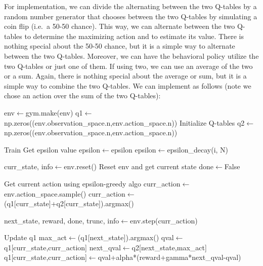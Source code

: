 For implementation, we can divide the alternating between the two Q-tables by a random number generator that chooses between the two Q-tables by simulating a coin flip (i.e.\ a 50-50 chance).
This way, we can alternate between the two Q-tables to determine the maximizing action and to estimate its value.
There is nothing special about the 50-50 chance, but it is a simple way to alternate between the two Q-tables.
Moreover, we can have the behavioral policy utilize the two Q-tables or just one of them.
If using two, we can use an average of the two or a sum.
Again, there is nothing special about the average or sum, but it is a simple way to combine the two Q-tables.
We can implement as follows (note we chose an action over the sum of the two Q-tables):
\begin{algorithm}[H]
\begin{algorithmic}[1]
        \State env$\gets$gym.make(env)
        \State q1$\gets$ np.zeros((env.observation\_space.n,env.action\_space.n))  \Comment Initialize Q-tables
        \State q2$\gets$ np.zeros((env.observation\_space.n,env.action\_space.n))

         \Comment Train
              \Comment Get epsilon value
                \State epsilon$\gets$epsilon
            \Else
                \State epsilon$\gets$epsilon\_decay(i, N)
            \EndIf

            \State curr\_state, info$\gets$env.reset()  \Comment Reset env and get current state
            \State done$\gets$False
        
                 \Comment Get current action using epsilon-greedy algo
                    \State curr\_action$\gets$env.action\_space.sample()
                \Else
                    \State curr\_action$\gets$(q1[curr\_state]+q2[curr\_state]).argmax()
                \EndIf

                \State next\_state, reward, done, trunc, info$\gets$env.step(curr\_action)

                 \Comment Update q1
                    \State max\_act$\gets$(q1[next\_state]).argmax()
                    \State qval$\gets$q1[curr\_state,curr\_action]
                    \State next\_qval$\gets$q2[next\_state,max\_act]
                    \State q1[curr\_state,curr\_action]$\gets$qval+alpha*(reward+gamma*next\_qval-qval)


\end{algorithmic}
\end{algorithm}
